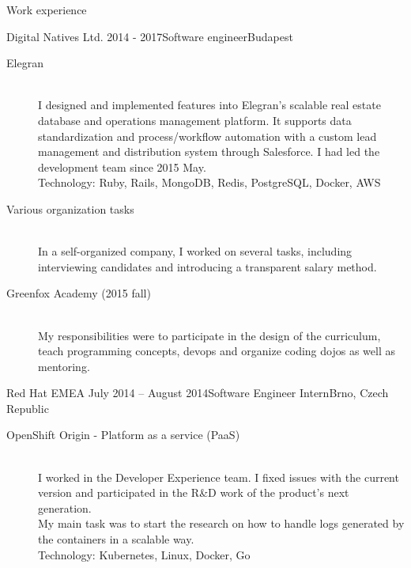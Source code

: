 \documentclass{resume} %
\begin{document}
\begin{rSection}{Work experience}
\begin{rSubsection}{Digital Natives Ltd.}
{2014 - 2017}{Software engineer}{Budapest}
  \begin{description}
    \item[Elegran] \hfill \\
    I designed and implemented features into Elegran’s scalable real estate
    database and operations management platform. It supports data standardization
    and process/workflow automation with a custom lead management and distribution
    system through Salesforce. I had led the development team since 2015 May. \\
    Technology: Ruby, Rails, MongoDB, Redis, PostgreSQL, Docker, AWS
  \end{description}
	\begin{description}
		\item[Various organization tasks] \hfill \\
		In a self-organized company, I worked on several tasks, including interviewing candidates
    and introducing a transparent salary method.
	\end{description}
	\begin{description}
		\item[Greenfox Academy (2015 fall)] \hfill \\
		My responsibilities were to participate in the design of the curriculum, teach
		programming concepts, devops and organize coding dojos as well as mentoring.
	\end{description}
\end{rSubsection}

\begin{rSubsection}{Red Hat EMEA}
{July 2014 – August 2014}{Software Engineer Intern}{Brno, Czech Republic}
	\begin{description}
		\item[OpenShift Origin - Platform as a service (PaaS)] \hfill \\
		I worked in the Developer Experience team. I fixed issues with the current version
		and participated in the R\&D work of the product's next generation.\\
		My main task was to start the research on how to handle logs generated by the containers
		in a scalable way. \\
		Technology: Kubernetes, Linux, Docker, Go
	\end{description}
\end{rSubsection}


\end{rSection}
\end{document}

